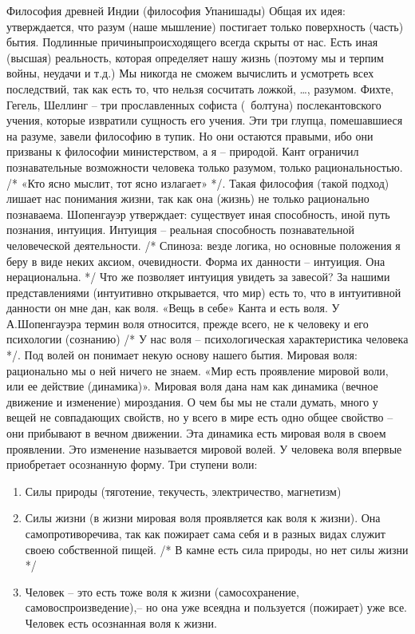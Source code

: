 \documentclass[12pt]{article}
\begin{document}
Философия древней Индии (философия Упанишады)
Общая их идея: утверждается, что разум (наше мышление) постигает только поверхность (часть) бытия.
Подлинные причиныпроисходящего всегда скрыты от нас. Есть иная (высшая) реальность, которая определяет
нашу жизнь (поэтому мы и терпим войны, неудачи и т.д.) Мы никогда не сможем вычислить и усмотреть всех
последствий, так как есть то, что нельзя сосчитать ложкой, …, разумом.
Фихте, Гегель, Шеллинг – три прославленных софиста (~болтуна) послекантовского учения, которые извратили
сущность его учения. Эти три глупца, помешавшиеся на разуме, завели философию в тупик. Но они остаются
правыми, ибо они призваны к философии министерством, а я – природой.
Кант ограничил познавательные возможности человека только разумом, только рациональностью. /* «Кто ясно
мыслит, тот ясно излагает» */. Такая философия (такой подход) лишает нас понимания жизни, так как она
(жизнь) не только рационально познаваема.
Шопенгауэр утверждает: существует иная способность, иной путь познания, интуиция.
Интуиция – реальная способность познавательной человеческой деятельности. /* Спиноза: везде логика, но
основные положения я беру в виде неких аксиом, очевидности. Форма их данности – интуиция. Она
нерациональна. */
Что же позволяет интуиция увидеть за завесой? За нашими представлениями (интуитивно открывается, что
мир) есть то, что в интуитивной данности он мне дан, как воля. «Вещь в себе» Канта и есть воля.
У А.Шопенгауэра термин воля относится, прежде всего, не к человеку и его психологии (сознанию) /* У нас
воля – психологическая характеристика человека */. Под волей он понимает некую основу нашего бытия.
Мировая воля: рационально мы о ней ничего не знаем. 
«Мир есть проявление мировой воли, или ее действие (динамика)». Мировая воля дана нам как динамика
(вечное движение и изменение) мироздания. О чем бы мы не стали думать, много у вещей не совпадающих
свойств, но у всего в мире есть одно общее свойство – они прибывают в вечном движении. Эта динамика есть
мировая воля в своем проявлении. Это изменение называется мировой волей.
У человека воля впервые приобретает осознанную форму.
Три ступени воли:
\begin{enumerate}
\item Силы природы (тяготение, текучесть, электричество, магнетизм)
\item Силы жизни (в жизни мировая воля проявляется как воля к жизни). Она самопротиворечива, так как пожирает
сама себя и в разных видах служит своею собственной пищей. /* В камне есть сила природы, но нет силы жизни
*/
\item Человек – это есть тоже воля к жизни (самосохранение, самовоспроизведение),– но она уже всеядна и
пользуется (пожирает) уже все. Человек есть осознанная воля к жизни.
\end{enumerate}
\end{document}
